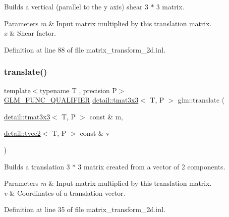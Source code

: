 Builds a vertical (parallel to the y axis) shear 3 $\ast$ 3 matrix.


\begin{DoxyParams}{Parameters}
{\em m} & Input matrix multiplied by this translation matrix. \\
\hline
{\em x} & Shear factor. \\
\hline
\end{DoxyParams}


Definition at line 88 of file matrix\+\_\+transform\+\_\+2d.\+inl.

\mbox{\label{group__gtx__matrix__transform__2d_gaa73c0e940e66b4e8aebf9dc72f5a7e34}} 
\subsubsection{\texorpdfstring{translate()}{translate()}}
{\footnotesize\ttfamily template$<$typename T , precision P$>$ \\
\hyperlink{setup_8hpp_a33fdea6f91c5f834105f7415e2a64407}{G\+L\+M\+\_\+\+F\+U\+N\+C\+\_\+\+Q\+U\+A\+L\+I\+F\+I\+ER} \hyperlink{structglm_1_1detail_1_1tmat3x3}{detail\+::tmat3x3}$<$ T, P $>$ glm\+::translate (\begin{DoxyParamCaption}\item[{\hyperlink{structglm_1_1detail_1_1tmat3x3}{detail\+::tmat3x3}$<$ T, P $>$ const \&}]{m,  }\item[{\hyperlink{structglm_1_1detail_1_1tvec2}{detail\+::tvec2}$<$ T, P $>$ const \&}]{v }\end{DoxyParamCaption})}

Builds a translation 3 $\ast$ 3 matrix created from a vector of 2 components.


\begin{DoxyParams}{Parameters}
{\em m} & Input matrix multiplied by this translation matrix. \\
\hline
{\em v} & Coordinates of a translation vector. \\
\hline
\end{DoxyParams}


Definition at line 35 of file matrix\+\_\+transform\+\_\+2d.\+inl.


